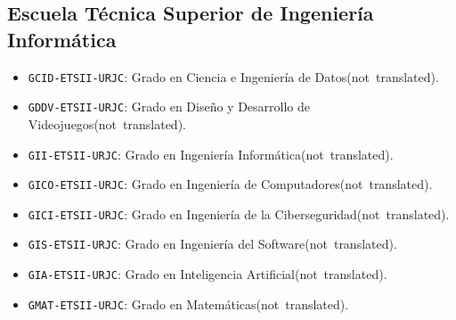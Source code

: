 \subsection {Escuela Técnica Superior de Ingeniería Informática}
\begin {itemize}
\item \texttt {GCID-ETSII-URJC}: Grado en Ciencia e Ingeniería de Datos\nobreakspace {}(\mbox {not translated}).
\item \texttt {GDDV-ETSII-URJC}: Grado en Diseño y Desarrollo de Videojuegos\nobreakspace {}(\mbox {not translated}).
\item \texttt {GII-ETSII-URJC}: Grado en Ingeniería Informática\nobreakspace {}(\mbox {not translated}).
\item \texttt {GICO-ETSII-URJC}: Grado en Ingeniería de Computadores\nobreakspace {}(\mbox {not translated}).
\item \texttt {GICI-ETSII-URJC}: Grado en Ingeniería de la Ciberseguridad\nobreakspace {}(\mbox {not translated}).
\item \texttt {GIS-ETSII-URJC}: Grado en Ingeniería del Software\nobreakspace {}(\mbox {not translated}).
\item \texttt {GIA-ETSII-URJC}: Grado en Inteligencia Artificial\nobreakspace {}(\mbox {not translated}).
\item \texttt {GMAT-ETSII-URJC}: Grado en Matemáticas\nobreakspace {}(\mbox {not translated}).
\end {itemize}
